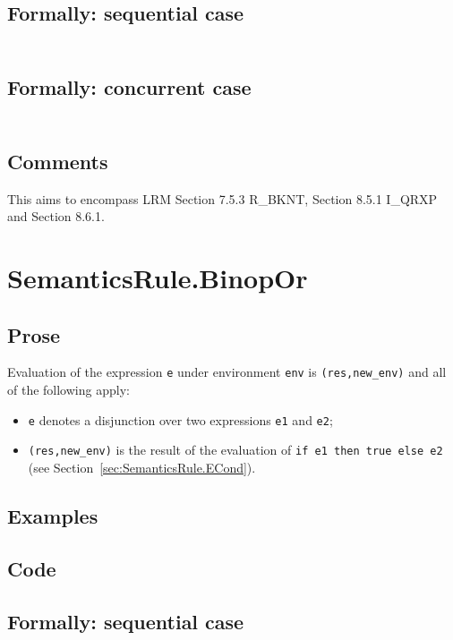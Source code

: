 \documentclass{book}
\begin{document}
  \subsection{Formally: sequential case}
  \begin{align}
  \end{align} 

  \subsection{Formally: concurrent case}
  \begin{align}
  \end{align} 

  \subsection{Comments}
  This aims to encompass LRM Section 7.5.3 R\_BKNT, Section 8.5.1 I\_QRXP and Section
  8.6.1.

\section{SemanticsRule.BinopOr \label{sec:SemanticsRule.BinopOr}}
  \subsection{Prose}

  Evaluation of the expression \texttt{e} under environment \texttt{env} is
  \texttt{(res,new\_env)} and all of the following apply:
  \begin{itemize}
  \item \texttt{e} denotes a disjunction over two expressions \texttt{e1} and \texttt{e2};
  \item \texttt{(res,new\_env)} is the result of the evaluation of \texttt{if 
e1 then true else e2} (see Section~\ref{sec:SemanticsRule.ECond}).
  \end{itemize}

  \subsection{Examples}

  \subsection{Code}

  \subsection{Formally: sequential case}
  \begin{align}
  \end{align} 
\end{document}
